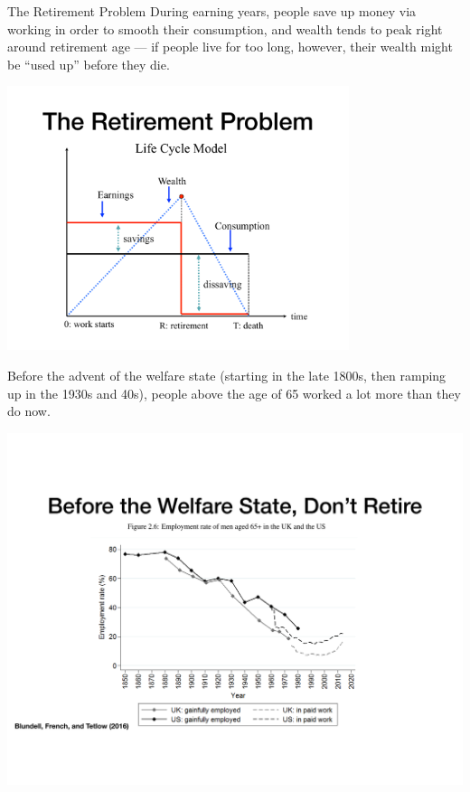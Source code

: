 \documentclass[8pt]{extarticle}
\begin{document}
  \begin{problem}{The Retirement Problem}
    During earning years, people save up money via working in order to smooth their consumption, and wealth tends to peak right around retirement age --- if people live for too long, however, their wealth might be ``used up'' before they die.
    \begin{center}
      \includegraphics[width=10cm]{images/retirement_problem.pdf}
    \end{center}
    Before the advent of the welfare state (starting in the late 1800s, then ramping up in the 1930s and 40s), people above the age of 65 worked a lot more than they do now.
    \begin{center}
      \includegraphics[width=\textwidth]{images/working_hours.pdf}
    \end{center}
    \begin{itemize}

\end{itemize}
\end{problem}
\end{document}

